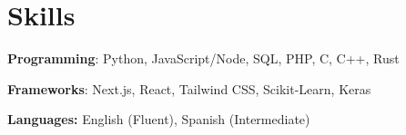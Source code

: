 \documentclass[letterpaper,11pt]{article}
\makeatletter
\newcommand{\resumeOrganizationHeading}[4]{
	\vspace{-2pt}\item
	\begin{tabular*}{0.97\textwidth}[t]{l@{\extracolsep{\fill}}r}
		\textbf{#1} & {\small #2} \\
		\textit{\small#3}
	\end{tabular*}\vspace{-7pt}
}
\newcommand{\resumeSmallOrganizationHeading}[4]{
	\small{
	\vspace{-2pt}\item
	\begin{tabular*}{0.97\textwidth}[t]{l@{\extracolsep{\fill}}r}
		\textbf{#1} & {\small #2} \\
		\textit{\small#3} & \textit{\small #4} 
	\end{tabular*}\vspace{-7pt}
	}
}
\newcommand{\resumeSubHeadingListStart}{\begin{itemize}[leftmargin=0.15in, label={}]}
\newcommand{\resumeSubHeadingListEnd}{\end{itemize}}
\makeatother
\begin{document}



\section{Skills}
\resumeSubHeadingListStart
\small{\item{
\textbf{Programming}: Python, JavaScript/Node, SQL, PHP, C, C++, Rust \\ \vspace{2pt}

\textbf{Frameworks}: Next.js, React, Tailwind CSS, Scikit-Learn, Keras \\ \vspace{2pt}




\textbf{Languages:} English (Fluent), Spanish (Intermediate)
}}
\resumeSubHeadingListEnd






\end{document}
